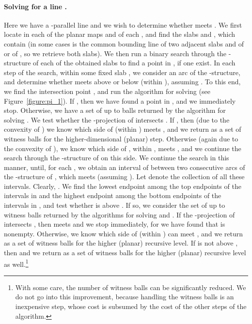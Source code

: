 \documentclass[a4paper,12pt]{article}
\begin{document}
\paragraph{\bf Solving  for a line .}
\label{subsec:Pi_1}
Here we have a -parallel line  and we
wish to determine whether  meets . We first locate  in
each of the planar maps  and  of each , and find
the slabs  and , which contain  (in some
cases  is the common bounding line of two adjacent slabs
 and  of  or of , so we retrieve
both slabs). We then run a binary search through the -structure
of each of the obtained slabs to find a point in , if
one exist. In each step of the search, within some fixed slab
, we consider an arc  of the -structure, and
determine whether  meets  above or below  (within
), assuming . To this end,
we find the intersection point , and run the
algorithm for solving  (see Figure~\ref{figure:pi_1}).
If , then we have found a point  in , and we
immediately stop. Otherwise, we have a set  of up to  balls returned by the algorithm for solving . We test
whether the -projection  of  intersects
. If , then (due to the convexity of
) we know which side of  (within ) meets ,
and we return  as a set of witness balls for the
higher-dimensional (planar) step. Otherwise (again due to the
convexity of ), we know which side of , within , meets
, and we continue the search through the -structure of
 on this side. We continue the search in this manner, until,
for each , we obtain an interval  of  between two
consecutive arcs of the -structure of , which meets 
(assuming ). Let  denote the
collection of all these intervals. Clearly, . We find the lowest endpoint  among the top
endpoints of the intervals in  and the highest endpoint 
among the bottom endpoints of the intervals in , and test
whether  is above . If so, we consider the set  of
up to  witness balls returned by the algorithms for
solving  and . If the -projection
 of  intersects , then  meets  and
we stop immediately, for we have found that  is nonempty.
Otherwise, we know which side of  (within ) can
meet , and we return  as a set of witness balls for the
higher (planar) recursive level. If  is not above , then
 and we return  as a set of witness
balls for the higher (planar) recursive level as well.\footnote{With
some care, the number of witness balls can be significantly reduced.
We do not go into this improvement, because handling the witness
balls is an inexpensive step, whose cost is subsumed by the cost of
the other steps of the algorithm.}
\end{document}
